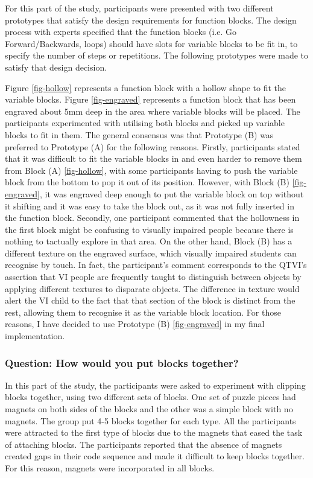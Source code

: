 \documentclass[oneside,%
                    author={Malak Hajji},
                    degree={BSc},
                    title={Designing An Accessible Ozobot Programming Platform for Students},
                  subtitle={With Mixed Visual Abilities}]{dissertation}
\begin{document}
For this part of the study, participants were presented with two different prototypes that satisfy the design requirements for function blocks. The design process with experts specified that the function blocks (i.e. Go Forward/Backwards, loops) should have slots for variable blocks to be fit in, to specify the number of steps or repetitions. The following prototypes were made to satisfy that design decision.


Figure \ref{fig-hollow} represents a function block with a hollow shape to fit the variable blocks. Figure \ref{fig-engraved} represents a function block that has been engraved about 5mm deep in the area where variable blocks will be placed. 
The participants experimented with utilising both blocks and picked up variable blocks to fit in them. 
The general consensus was that Prototype (B) was preferred to Prototype (A) for the following reasons. Firstly, participants stated that it was difficult to fit the variable blocks in and even harder to remove them from Block (A) \ref{fig-hollow}, with some participants having to push the variable block from the bottom to pop it out of its position. However, with Block (B) \ref{fig-engraved}, it was engraved deep enough to put the variable block on top without it shifting and it was easy to take the block out, as it was not fully inserted in the function block. Secondly, one participant commented that the hollowness in the first block might be confusing to visually impaired people because there is nothing to tactually explore in that area. On the other hand, Block (B) has a different texture on the engraved surface, which visually impaired students can recognise by touch. In fact, the participant's comment corresponds to the QTVI's assertion that VI people are frequently taught to distinguish between objects by applying different textures to disparate objects. The difference in texture would alert the VI child to the fact that that section of the block is distinct from the rest, allowing them to recognise it as the variable block location.
For those reasons, I have decided to use Prototype (B) \ref{fig-engraved} in my final implementation.

\subsubsection{Question: How would you put blocks together?}
In this part of the study, the participants were asked to experiment with clipping blocks together, using two different sets of blocks. One set of puzzle pieces had magnets on both sides of the blocks and the other was a simple block with no magnets.
The group put 4-5 blocks together for each type.
All the participants were attracted to the first type of blocks due to the magnets that eased the task of attaching blocks. The participants reported that the absence of magnets created gaps in their code sequence and made it difficult to keep blocks together. For this reason, magnets were incorporated in all blocks.
\end{document}
